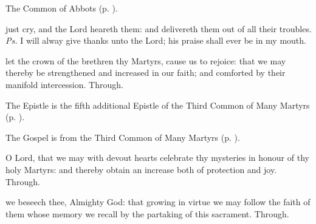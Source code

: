 
\begin{rubric}
	The Common of Abbots (p. \pageref{CommonAbbots}).
\end{rubric}



\introit
{} just cry, and the Lord heareth them: and delivereth them out of all their troubles. \textit{Ps.} I will alway give thanks unto the Lord; his praise shall ever be in my mouth.

\collect
{} let the crown of the brethren thy Martyrs, cause us to rejoice: that we may thereby be strengthened and increased in our faith; and comforted by their manifold intercession. Through.

\begin{rubric}
	The Epistle is the fifth additional Epistle of the Third Common of Many Martyrs (p. \pageref{Hebrews1133}).
\end{rubric}


\begin{rubric}
	The Gospel is from the Third Common of Many Martyrs (p. \pageref{CommonMartyrsIIGospel}).
\end{rubric}


\secret
{} O Lord, that we may with devout hearts celebrate thy mysteries in honour of thy holy Martyrs: and thereby obtain an increase both of protection and joy. Through.


\postcommunion
{} we beseech thee, Almighty God: that growing in virtue we may follow the faith of them whose memory we recall by the partaking of this sacrament. Through.


